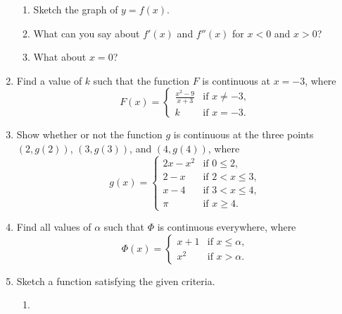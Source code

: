 \begin{enumerate}
    \begin{enumerate}
      \item Sketch the graph of $ y = f(x) $.
      \item What can you say about $ f'(x) $ and $ f''(x) $ for $ x < 0 $ and $ x > 0 $?
      \item What about $ x = 0 $?
    \end{enumerate}
  \item Find a value of $ k $ such that the function $ F $ is continuous at $ x = -3 $, where
        \begin{displaymath}
          F(x) =
          \begin{cases}
            \frac{x^2 - 9}{x+3} & \text{if } x \neq -3,\\
            k                   & \text{if } x = -3.
          \end{cases}
        \end{displaymath}
  \item Show whether or not the function $ g $ is continuous at the three points $(2, g(2)) $, $ (3,g(3)) $, and  $(4,g(4)) $, where
        \begin{displaymath}
          g(x) =
          \begin{cases}
            2x-x^2              & \text{if } 0 \leq 2,\\
            2-x                 & \text{if } 2 < x \leq 3,\\
            x-4                 & \text{if } 3 < x \leq 4,\\
            \pi                 & \text{if } x \geq 4.
          \end{cases}
        \end{displaymath}
  \item Find all values of $ \alpha $ such that $ \Phi $ is continuous everywhere, where
        \begin{displaymath}
          \Phi(x) =
          \begin{cases}
            x+1                 & \text{if } x \leq \alpha, \\
            x^2                 & \text{if } x > \alpha.
          \end{cases}
        \end{displaymath}
  \item Sketch a function satisfying the given criteria.
    \begin{enumerate}
      \item
        \begin{itemize}

\end{itemize}
\end{enumerate}
\end{enumerate}
